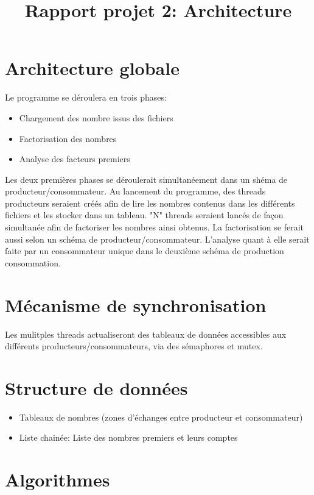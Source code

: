 \documentclass[11pt,a4paper]{article}
\begin{document}
\title{Rapport projet 2: Architecture}
\maketitle

\section{Architecture globale}
Le programme se déroulera en trois phases:

\begin{itemize}
\item{Chargement des nombre issus des fichiers}
\item{Factorisation des nombres}
\item{Analyse des facteurs premiers}
\end{itemize}

Les deux premières phases se déroulerait simultanéement dans un shéma de producteur/consommateur. Au lancement du programme, des threads producteurs seraient créés afin de lire les nombres contenus dans les différents fichiers et les stocker dans un tableau. "N" threads seraient lancés de façon simultanée afin de factoriser les nombres ainsi obtenus. La factorisation se ferait aussi selon un schéma de producteur/consommateur. L'analyse quant à elle serait faite par un consommateur unique dans le deuxième schéma de production consommation. 

\section{Mécanisme de synchronisation}
Les mulitples threads actualiseront des tableaux de données accessibles aux différents producteurs/consommateurs, via des sémaphores et mutex.  

\section{Structure de données}
\begin{itemize}
\item{Tableaux de nombres (zones d'échanges entre producteur et consommateur)}
\item{Liste chainée: Liste des nombres premiers et leurs comptes}
\end{itemize}

\section{Algorithmes}
\end{document}

